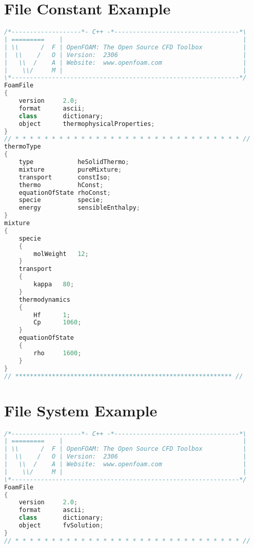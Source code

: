 \begin{theappendices}
\chapter{File Constant Example}
\begin{lstlisting}[language=c++, caption=OF dictiorary in $constant/Brick/thermoPhysicalProperties$]
/*-------------------*- C++ -*----------------------------------*\
| =========    |                                                 |
| \\      /  F | OpenFOAM: The Open Source CFD Toolbox           |
|  \\    /   O | Version:  2306                                  |
|   \\  /    A | Website:  www.openfoam.com                      |
|    \\/     M |                                                 |
\*--------------------------------------------------------------*/
FoamFile
{
    version     2.0;
    format      ascii;
    class       dictionary;
    object      thermophysicalProperties;
}
// * * * * * * * * * * * * * * * * * * * * * * * * * * * * * * * //
thermoType
{
    type            heSolidThermo;
    mixture         pureMixture;
    transport       constIso;
    thermo          hConst;
    equationOfState rhoConst;
    specie          specie;
    energy          sensibleEnthalpy;
}
mixture
{
    specie
    {
        molWeight   12;
    }
    transport
    {
        kappa   80;
    }
    thermodynamics
    {
        Hf      1;
        Cp      1060;
    }
    equationOfState
    {
        rho     1600;
    }
}
// *********************************************************** //
\end{lstlisting}






\singlespacing
\chapter{File System Example}
\begin{lstlisting}[language=c++, caption=OF dictiorary in $system/Brick/fvSolution$]
/*-------------------*- C++ -*----------------------------------*\
| =========    |                                                 |
| \\      /  F | OpenFOAM: The Open Source CFD Toolbox           |
|  \\    /   O | Version:  2306                                  |
|   \\  /    A | Website:  www.openfoam.com                      |
|    \\/     M |                                                 |
\*--------------------------------------------------------------*/
FoamFile
{
    version     2.0;
    format      ascii;
    class       dictionary;
    object      fvSolution;
}
// * * * * * * * * * * * * * * * * * * * * * * * * * * * * * * * //


\end{lstlisting}
\end{theappendices}
